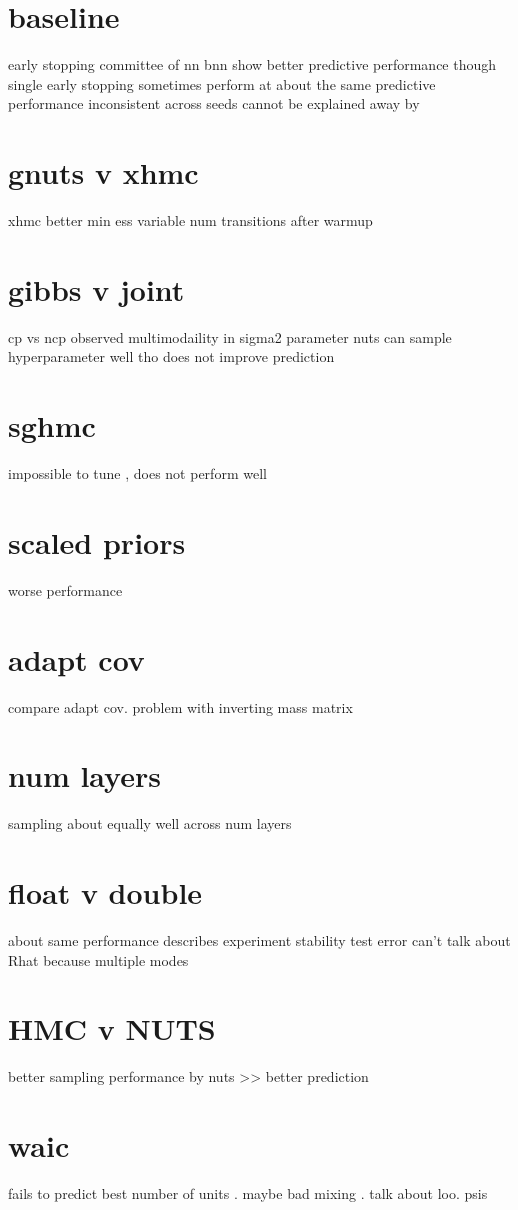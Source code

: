 \documentclass[]{report}
\begin{document}
\section{baseline}
early stopping committee of nn 
bnn show better predictive performance 
though single early stopping sometimes perform at about the same predictive performance inconsistent across seeds 
cannot be explained away by 
\section{gnuts v xhmc}
xhmc better min ess 
variable num transitions after warmup
\section{gibbs v joint}
cp vs ncp 
observed multimodaility in sigma2 parameter 
nuts can sample hyperparameter well tho does not improve prediction

\section{sghmc}
impossible to tune , does not perform well
\section{scaled priors}
worse performance 
\section{adapt cov}
compare adapt cov. problem with inverting mass matrix
\section{num layers}
sampling about equally well across num layers
\section{float v double}
about same performance describes experiment 
stability 
test error 
can't talk about Rhat because multiple modes 
\section{HMC v NUTS}
better sampling performance by nuts >> better prediction 
\section{waic}
fails to predict best number of units . maybe bad mixing . talk about loo. psis
\end{document}
